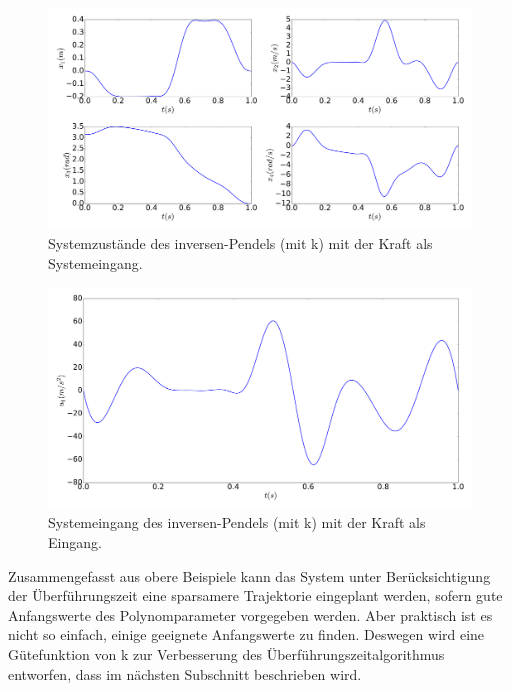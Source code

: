 \begin{beispiel}
	\begin{figure}
		\centering
		\includegraphics[width=15.5cm]{bild/30_32/example0_mit_k_x_con.pdf}
		\caption{Systemzustände des inversen-Pendels (mit k) mit der Kraft als Systemeingang.}
		\label{fig:Inverses_Pendel_mit_k_x_con}
	\end{figure}
	
	\begin{figure}
		\centering
		\includegraphics[width=12cm]{bild/30_32/example0_mit_k_u_con.pdf}
		\caption{Systemeingang des inversen-Pendels (mit k) mit der Kraft als Eingang.}
		\label{fig:Inverses_Pendel_mit_k_u_con}
	\end{figure}

\end{beispiel}
\newpage
Zusammengefasst aus obere Beispiele kann das System unter Berücksichtigung der Überführungszeit eine sparsamere Trajektorie eingeplant werden, sofern gute Anfangswerte des Polynomparameter vorgegeben werden. Aber praktisch ist es nicht so einfach, einige geeignete Anfangswerte zu finden. Deswegen wird eine Gütefunktion von k zur Verbesserung des Überführungszeitalgorithmus entworfen, dass im nächsten Subschnitt beschrieben wird.


